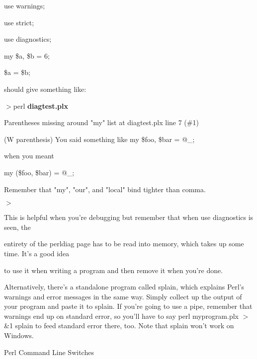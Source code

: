 \documentclass[a4paper,11pt]{book}
\begin{document}
\noindent use warnings;

\noindent use strict;

\noindent use diagnostics;

\noindent 

\noindent my \$a, \$b = 6;

\noindent \$a = \$b;

\noindent 

\noindent should give something like:

\noindent 

\noindent $>$perl \textbf{diagtest.plx}

\noindent Parentheses missing around "my" list at diagtest.plx line 7 (\#1)

\noindent (W parenthesis) You said something like my \$foo, \$bar = @\_;

\noindent 

\noindent 

\noindent when you meant

\noindent 

\noindent my (\$foo, \$bar) = @\_;

\noindent 

\noindent Remember that "my", "our", and "local" bind tighter than comma.

\noindent $>$

\noindent 

\noindent This is helpful when you're debugging but remember that when use diagnostics is seen, the

\noindent entirety of the perldiag page has to be read into memory, which takes up some time. It's a good idea

\noindent to use it when writing a program and then remove it when you're done.

\noindent 

\noindent Alternatively, there's a standalone program called splain, which explains Perl's warnings and error messages in the same way. Simply collect up the output of your program and paste it to splain. If you're going to use a pipe, remember that warnings end up on standard error, so you'll have to say perl myprogram.plx $>$\&1 \textbar   splain to feed standard error there, too. Note that splain won't work on Windows.

\noindent 

\noindent 

\noindent Perl Command Line Switches

\noindent 
\end{document}
